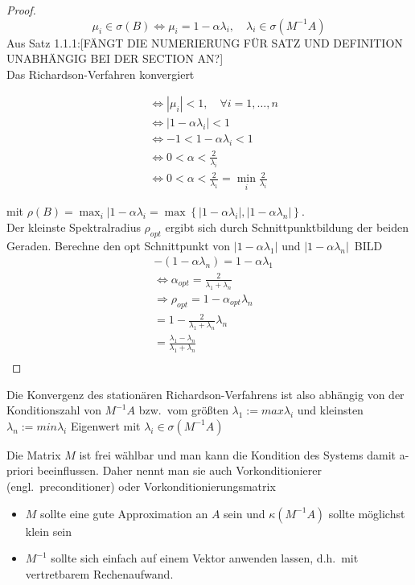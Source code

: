  \begin{proof}
   \begin{equation*}
     \mu_i \in \sigma(B) \Leftrightarrow \mu_i = 1-\alpha \lambda_i, \quad \lambda_i\in \sigma(M^{-1}A)
   \end{equation*}
   Aus Satz 1.1.1:[FÄNGT DIE NUMERIERUNG FÜR SATZ UND DEFINITION UNABHÄNGIG BEI DER SECTION AN?]\\
   Das Richardson-Verfahren konvergiert

   \begin{align*} 
     &\Leftrightarrow |\mu_i| <1, \quad \forall i = 1, \dots, n\\
     &\Leftrightarrow |1-\alpha\lambda_i| < 1\\
     &\Leftrightarrow -1 < 1 - \alpha \lambda_i < 1 \\
     &\Leftrightarrow 0 < \alpha < \frac{2}{\lambda_i} \\
     &\Leftrightarrow 0 < \alpha < \frac{2}{\lambda_1} = \min_i \frac{2}{\lambda_i}
   \end{align*}

   mit $\rho(B) = \max_i |1-\alpha\lambda_i = \max \left\{ |1-\alpha\lambda_i|, |1-\alpha\lambda_n| \right\}$.\\
   Der kleinste Spektralradius $\rho_{opt}$ ergibt sich durch Schnittpunktbildung der beiden Geraden. Berechne den opt Schnittpunkt von $|1-\alpha\lambda_1|$ und $|1-\alpha\lambda_n|$\
BILD
   \begin{align*}
     &-(1-\alpha\lambda_n) = 1-\alpha\lambda_1 \\
     &\Leftrightarrow \alpha_{opt} = \frac{2}{\lambda_1+\lambda_n}\\
     &\Rightarrow \rho_{opt} = 1-\alpha_{opt} \lambda_n\\
                             &= 1 - \frac{2}{\lambda_1+\lambda_n} \lambda_n\\ 
                             &= \frac{\lambda_1-\lambda_n}{\lambda_1+\lambda_n}\\
   \end{align*}
 \end{proof}

 Die Konvergenz des stationären Richardson-Verfahrens ist also abhängig von der Konditionszahl von $M^{-1}A$ bzw.\ vom größten $\lambda_1 := max \lambda_i$ und kleinsten $\lambda_n := min \lambda_i$ Eigenwert mit $\lambda_i \in \sigma(M^{-1}A)$

 \begin{bemerkung}
 Die Matrix $M$ ist frei wählbar und man kann die Kondition des Systems damit a-priori beeinflussen. Daher nennt man sie auch Vorkonditionierer (engl.\ preconditioner) oder Vorkonditionierungsmatrix
 \begin{itemize}
   \item $M$ sollte eine gute Approximation an $A$ sein und $\kappa(M^{-1}A)$ sollte möglichst klein sein
   \item $M^{-1}$ sollte sich einfach auf einem Vektor anwenden lassen, d.h.\ mit vertretbarem Rechenaufwand. 
 \end{itemize}
 \end{bemerkung}

